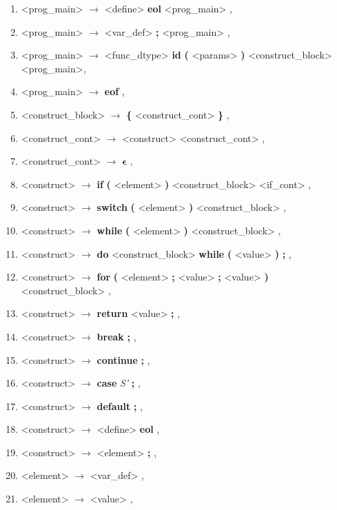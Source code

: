 \begin{enumerate}[label={\arabic*:}]
    \item <prog\_main> $\longrightarrow$ <define> \textbf{eol} <prog\_main> ,
    \item <prog\_main> $\longrightarrow$ <var\_def> \textbf{;} <prog\_main> ,
    \item <prog\_main> $\longrightarrow$ <func\_dtype> \textbf{id} \textbf{(} <params> \textbf{)} <construct\_block> <prog\_main>,
    \item <prog\_main> $\longrightarrow$ \textbf{eof} ,
    \item <construct\_block> $\longrightarrow$ \textbf{\{} <construct\_cont> \textbf{\}} ,

    \item <construct\_cont> $\longrightarrow$  <construct> <construct\_cont> ,
    \item <construct\_cont> $\longrightarrow$  $\mathbf{ \epsilon }$ ,
    \item <construct> $\longrightarrow$ \textbf{if} \textbf{(} <element> \textbf{)} <construct\_block> <if\_cont> ,
    \item <construct> $\longrightarrow$ \textbf{switch} \textbf{(} <element> \textbf{)} <construct\_block> ,
    \item <construct> $\longrightarrow$ \textbf{while} \textbf{(} <element> \textbf{)} <construct\_block> ,
    \item <construct> $\longrightarrow$ \textbf{do} <construct\_block> \textbf{while} \textbf{(} <value> \textbf{)} \textbf{;} ,
    \item <construct> $\longrightarrow$ \textbf{for} \textbf{(} <element> \textbf{;} <value> \textbf{;} <value> \textbf{)} <construct\_block> ,
    \item <construct> $\longrightarrow$ \textbf{return} <value> \textbf{;} ,
    \item <construct> $\longrightarrow$ \textbf{break} \textbf{;} ,
    \item <construct> $\longrightarrow$ \textbf{continue} \textbf{;} ,
    \item <construct> $\longrightarrow$ \textbf{case} \emph{S'} \textbf{;} ,
    \item <construct> $\longrightarrow$ \textbf{default} \textbf{;} ,
    \item <construct> $\longrightarrow$ <define> \textbf{eol} ,
    \item <construct> $\longrightarrow$ <element> \textbf{;} ,

    \item <element> $\longrightarrow$ <var\_def> ,
    \item <element> $\longrightarrow$ <value> ,


\end{enumerate}
